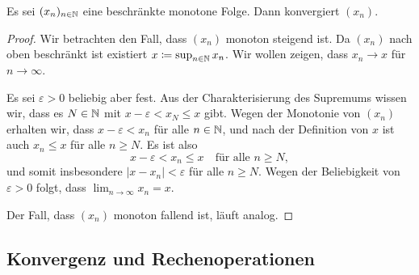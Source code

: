 \documentclass[a4paper,10pt]{article}
\begin{document}
\begin{prop}
 Es sei $(x_n)_{n \in \mathbb{N}}$ eine beschränkte monotone Folge. Dann konvergiert $(x_n)$.
\end{prop}
\begin{proof}
 Wir betrachten den Fall, dass $(x_n)$ monoton steigend ist. Da $(x_n)$ nach oben beschränkt ist existiert $x \coloneqq \sup_{n \in \mathbb{N}} x_n$. Wir wollen zeigen, dass $x_n \to x$ für $n \to \infty$.
 
 Es sei $\varepsilon > 0$ beliebig aber fest. Aus der Charakterisierung des Supremums wissen wir, dass es $N \in \mathbb{N}$ mit $x - \varepsilon < x_N \leq x$ gibt. Wegen der Monotonie von $(x_n)$ erhalten wir, dass $x - \varepsilon < x_n$ für alle $n \in \mathbb{N}$, und nach der Definition von $x$ ist auch $x_n \leq x$ für alle $n \geq N$. Es ist also
 \[
  x - \varepsilon < x_n \leq x \quad \text{für alle $n \geq N$},
 \]
 und somit insbesondere $|x - x_n| < \varepsilon$ für alle $n \geq N$. Wegen der Beliebigkeit von $\varepsilon > 0$ folgt, dass $\lim_{n \to \infty} x_n = x$.
 
 Der Fall, dass $(x_n)$ monoton fallend ist, läuft analog.
\end{proof}



\subsection{Konvergenz und Rechenoperationen}
\end{document}

